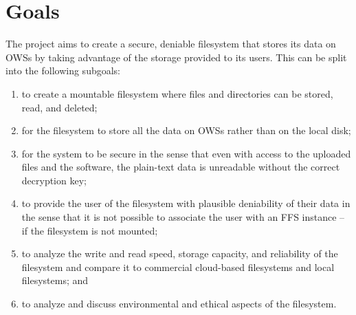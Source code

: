 
\section{Goals}
\label{sec:goals}


The project aims to create a secure, deniable filesystem that stores its data on \glspl{OWS} by taking advantage of the storage provided to its users. This can be split into the following subgoals:
\begin{enumerate}
\item to create a mountable filesystem where files and directories can be stored, read, and deleted;

\item for the filesystem to store all the data on \glspl{OWS} rather than on the local disk;

\item for the system to be secure in the sense that even with access to the uploaded files and the software, the \mbox{plain-text} data is unreadable without the correct decryption key;

\item to provide the user of the filesystem with plausible deniability of their data in the sense that it is not possible to associate the user with an \gls{FFS} instance -- if the filesystem is not mounted;

\item to analyze the write and read speed, storage capacity, and reliability of the filesystem and compare it to commercial \mbox{cloud-based} filesystems and local filesystems; and

\item to analyze and discuss environmental and ethical aspects of the filesystem.
\end{enumerate}

